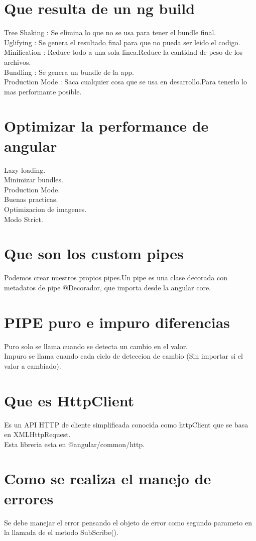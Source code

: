 \section{Que resulta de un ng build}
Tree Shaking : Se elimina lo que no se usa para tener el bundle final.\\
Uglifying : Se genera el resultado final para que no pueda ser leido el codigo.\\
Minification : Reduce todo a una sola linea.Reduce la cantidad de peso de los archivos.\\
Bundling : Se genera un bundle de la app.\\
Production Mode : Saca cualquier cosa que se usa en desarrollo.Para tenerlo lo mas performante
posible.
\section{Optimizar la performance de angular}
Lazy loading.\\
Minimizar bundles.\\
Production Mode.\\
Buenas practicas.\\
Optimizacion de imagenes.\\
Modo Strict.
\section{Que son los custom pipes}
Podemos crear nuestros propios pipes.Un pipe es una clase decorada con metadatos de pipe @Decorador,
que importa desde la angular core. 
\section{PIPE puro e impuro diferencias}
Puro solo se llama cuando se detecta un cambio en el valor.\\
Impuro se llama cuando cada ciclo de deteccion de cambio (Sin importar si el valor a cambiado).
\section{Que es HttpClient}
Es un API HTTP de cliente simplificada conocida como httpClient que se basa en XMLHttpRequest.\\
Esta libreria esta en @angular/common/http.
\section{Como se realiza el manejo de errores}
Se debe manejar el error pensando el objeto de error como segundo parameto en la llamada de el
metodo SubScribe().

